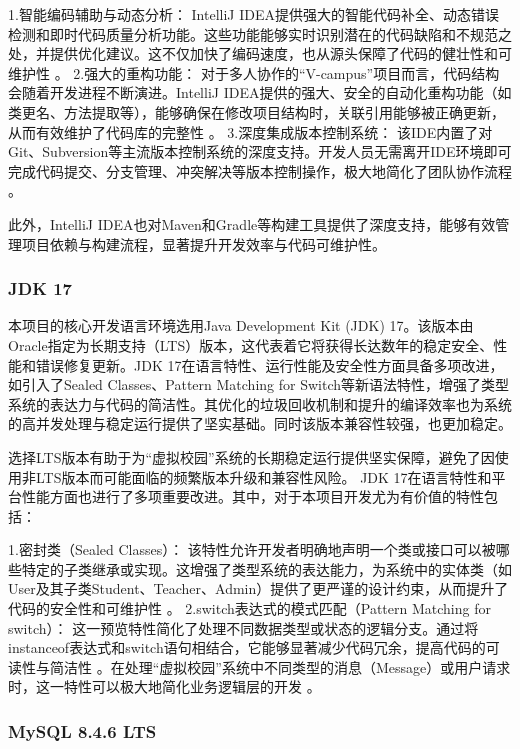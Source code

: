 \documentclass[a4paper]{ctexart}
\begin{document}
1.智能编码辅助与动态分析： IntelliJ IDEA提供强大的智能代码补全、动态错误检测和即时代码质量分析功能。这些功能能够实时识别潜在的代码缺陷和不规范之处，并提供优化建议。这不仅加快了编码速度，也从源头保障了代码的健壮性和可维护性 。
2.强大的重构功能： 对于多人协作的“V-campus”项目而言，代码结构会随着开发进程不断演进。IntelliJ IDEA提供的强大、安全的自动化重构功能（如类更名、方法提取等），能够确保在修改项目结构时，关联引用能够被正确更新，从而有效维护了代码库的完整性 。
3.深度集成版本控制系统： 该IDE内置了对Git、Subversion等主流版本控制系统的深度支持。开发人员无需离开IDE环境即可完成代码提交、分支管理、冲突解决等版本控制操作，极大地简化了团队协作流程 。

此外，IntelliJ IDEA也对Maven和Gradle等构建工具提供了深度支持，能够有效管理项目依赖与构建流程，显著提升开发效率与代码可维护性。

\subsubsection{JDK 17}

本项目的核心开发语言环境选用Java Development Kit (JDK) 17。该版本由Oracle指定为长期支持（LTS）版本，这代表着它将获得长达数年的稳定安全、性能和错误修复更新。JDK 17在语言特性、运行性能及安全性方面具备多项改进，如引入了Sealed Classes、Pattern Matching for Switch等新语法特性，增强了类型系统的表达力与代码的简洁性。其优化的垃圾回收机制和提升的编译效率也为系统的高并发处理与稳定运行提供了坚实基础。同时该版本兼容性较强，也更加稳定。

选择LTS版本有助于为“虚拟校园”系统的长期稳定运行提供坚实保障，避免了因使用非LTS版本而可能面临的频繁版本升级和兼容性风险。 JDK 17在语言特性和平台性能方面也进行了多项重要改进。其中，对于本项目开发尤为有价值的特性包括：

1.密封类（Sealed Classes）： 该特性允许开发者明确地声明一个类或接口可以被哪些特定的子类继承或实现。这增强了类型系统的表达能力，为系统中的实体类（如User及其子类Student、Teacher、Admin）提供了更严谨的设计约束，从而提升了代码的安全性和可维护性 。
2.switch表达式的模式匹配（Pattern Matching for switch）： 这一预览特性简化了处理不同数据类型或状态的逻辑分支。通过将instanceof表达式和switch语句相结合，它能够显著减少代码冗余，提高代码的可读性与简洁性 。在处理“虚拟校园”系统中不同类型的消息（Message）或用户请求时，这一特性可以极大地简化业务逻辑层的开发 。

\subsubsection{MySQL 8.4.6 LTS}
\end{document}
